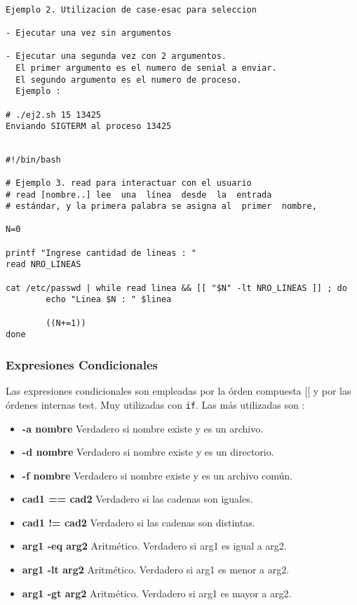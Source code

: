 \documentclass{beamer}
\begin{document}
\begin{Verbatim}

Ejemplo 2. Utilizacion de case-esac para seleccion

- Ejecutar una vez sin argumentos

- Ejecutar una segunda vez con 2 argumentos.
  El primer argumento es el numero de senial a enviar.
  El segundo argumento es el numero de proceso.
  Ejemplo : 

# ./ej2.sh 15 13425
Enviando SIGTERM al proceso 13425


\end{Verbatim}

\begin{Verbatim}
#!/bin/bash

# Ejemplo 3. read para interactuar con el usuario
# read [nombre..] lee  una  línea  desde  la  entrada
# estándar, y la primera palabra se asigna al  primer  nombre,

N=0

printf "Ingrese cantidad de lineas : "
read NRO_LINEAS

cat /etc/passwd | while read linea && [[ "$N" -lt NRO_LINEAS ]] ; do
        echo "Linea $N : " $linea

        ((N+=1))
done

\end{Verbatim}




\begin{frame}
\frametitle{Expresiones Condicionales}
Las expresiones condicionales son empleadas por la órden compuesta [[ y por las órdenes internas test. Muy utilizadas con \texttt{if}. Las más utilizadas son :

\begin{itemize}
\item \textbf{-a nombre} Verdadero si nombre existe y es un archivo.
\item \textbf{-d nombre} Verdadero si nombre existe y es un directorio.
\item \textbf{-f nombre} Verdadero si nombre existe y es un archivo común.
\item \textbf{cad1 == cad2 } Verdadero si las cadenas son iguales.
\item \textbf{cad1 != cad2 } Verdadero si las cadenas son distintas.
\item \textbf{arg1 -eq arg2} Aritmético. Verdadero si arg1 es igual a arg2.
\item \textbf{arg1 -lt arg2} Aritmético. Verdadero si arg1 es menor a arg2.
\item \textbf{arg1 -gt arg2} Aritmético. Verdadero si arg1 es mayor a arg2.

\end{itemize}
\end{frame}
\end{document}
